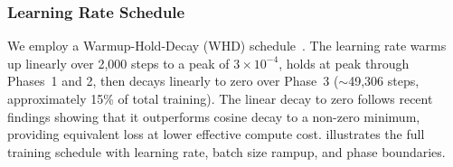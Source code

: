 \documentclass{llmxive}
\begin{document}
\subsubsection{Learning Rate Schedule}

We employ a Warmup-Hold-Decay (WHD) schedule~\cite{hu2024minicpm,hagele2024scaling}.
The learning rate warms up linearly over 2{,}000 steps to a peak of $3 \times 10^{-4}$,
holds at peak through Phases~1 and 2, then decays linearly to zero over
Phase~3 (${\sim}$49{,}306 steps, approximately 15\% of total training). The
linear decay to zero follows recent findings showing that it outperforms cosine
decay to a non-zero minimum, providing equivalent loss at lower effective
compute cost.  illustrates the full training schedule
with learning rate, batch size rampup, and phase boundaries.
\end{document}
